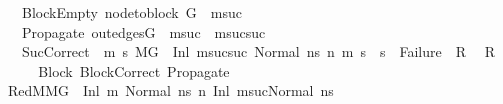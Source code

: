 \begin{isabellebody}
\ \ \ Block{}Empty{\isacharcolon}{\kern0pt}\ {\isachardoublequoteopen}node{\isacharunderscore}{\kern0pt}to{\isacharunderscore}{\kern0pt}block\ G{}\ {\isacharbang}{\kern0pt}\ m{}{\isacharunderscore}{\kern0pt}suc\ {\isacharequal}{\kern0pt}\ {\isacharbrackleft}{\kern0pt}{\isacharbrackright}{\kern0pt}{\isachardoublequoteclose}\ \isanewline
\ \ \ Propagate{}{\isacharcolon}{\kern0pt}\ {\isachardoublequoteopen}out{\isacharunderscore}{\kern0pt}edges{\isacharparenleft}{\kern0pt}G{}{\isacharparenright}{\kern0pt}\ {\isacharbang}{\kern0pt}\ m{}{\isacharunderscore}{\kern0pt}suc\ {\isacharequal}{\kern0pt}\ {\isacharbrackleft}{\kern0pt}m{}{\isacharunderscore}{\kern0pt}suc{\isacharunderscore}{\kern0pt}suc{\isacharbrackright}{\kern0pt}{\isachardoublequoteclose}\ \ \ \ \ \ \ \ \ \ \ \ \ \ \ \ \ \isanewline
\ \ \ SucCorrect{\isacharcolon}{\kern0pt}\ {\isachardoublequoteopen}{\isacharparenleft}{\kern0pt}{\isasymAnd}\ m{}{\isacharprime}{\kern0pt}\ s{}{\isacharprime}{\kern0pt}{\isachardot}{\kern0pt}\ {\isacharparenleft}{\kern0pt}M{\isacharcomma}{\kern0pt}{\isasymLambda}{\isacharcomma}{\kern0pt}{\isasymGamma}{\isacharcomma}{\kern0pt}{\isasymOmega}{\isacharcomma}{\kern0pt}G{}\ {\isasymturnstile}\ {\isacharparenleft}{\kern0pt}Inl\ m{}{\isacharunderscore}{\kern0pt}suc{\isacharunderscore}{\kern0pt}suc{\isacharcomma}{\kern0pt}\ Normal\ ns{}{\isacharparenright}{\kern0pt}\ {\isacharminus}{\kern0pt}n{\isasymrightarrow}{\isacharasterisk}{\kern0pt}\ {\isacharparenleft}{\kern0pt}m{}{\isacharprime}{\kern0pt}{\isacharcomma}{\kern0pt}\ s{}{\isacharprime}{\kern0pt}{\isacharparenright}{\kern0pt}{\isacharparenright}{\kern0pt}\ {\isasymLongrightarrow}\ s{}{\isacharprime}{\kern0pt}\ {\isasymnoteq}\ Failure{\isacharparenright}{\kern0pt}\ {\isasymLongrightarrow}\ R{\isachardoublequoteclose}\isanewline
\ \ {\isachardoublequoteopen}R{\isachardoublequoteclose}\isanewline
%
\isadelimproof
%
\endisadelimproof
%
\isatagproof
{}\isamarkupfalse%
\ {\isacharminus}{\kern0pt}\isanewline
\ \ \isamarkupfalse%
\ Block\ BlockCorrect\ Propagate{}\ \isamarkupfalse%
\ RedM{}{\isacharcolon}{\kern0pt}{\isachardoublequoteopen}M{\isacharcomma}{\kern0pt}{\isasymLambda}{\isacharcomma}{\kern0pt}{\isasymGamma}{\isacharcomma}{\kern0pt}{\isasymOmega}{\isacharcomma}{\kern0pt}G{}\ {\isasymturnstile}\ {\isacharparenleft}{\kern0pt}Inl\ m{}{\isacharcomma}{\kern0pt}\ Normal\ ns{}{\isacharparenright}{\kern0pt}\ {\isacharminus}{\kern0pt}n{\isasymrightarrow}\ {\isacharparenleft}{\kern0pt}Inl\ m{}{\isacharunderscore}{\kern0pt}suc{\isacharcomma}{\kern0pt}Normal\ ns{}{\isacharparenright}{\kern0pt}{\isachardoublequoteclose}\isanewline

\end{isabellebody}
